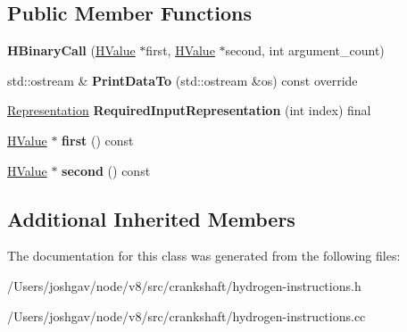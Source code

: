 \subsection*{Public Member Functions}
\begin{DoxyCompactItemize}
\item 
{\bfseries H\+Binary\+Call} (\hyperlink{classv8_1_1internal_1_1_h_value}{H\+Value} $\ast$first, \hyperlink{classv8_1_1internal_1_1_h_value}{H\+Value} $\ast$second, int argument\+\_\+count)\hypertarget{classv8_1_1internal_1_1_h_binary_call_ab826c7aadd4a8ca53a6670b9f3a9cb20}{}\label{classv8_1_1internal_1_1_h_binary_call_ab826c7aadd4a8ca53a6670b9f3a9cb20}

\item 
std\+::ostream \& {\bfseries Print\+Data\+To} (std\+::ostream \&os) const  override\hypertarget{classv8_1_1internal_1_1_h_binary_call_a41e5f4c83245c438247fb8194d9e87e8}{}\label{classv8_1_1internal_1_1_h_binary_call_a41e5f4c83245c438247fb8194d9e87e8}

\item 
\hyperlink{classv8_1_1internal_1_1_representation}{Representation} {\bfseries Required\+Input\+Representation} (int index) final\hypertarget{classv8_1_1internal_1_1_h_binary_call_ade54fc94ee05f7b16de6ad5ade9bff4e}{}\label{classv8_1_1internal_1_1_h_binary_call_ade54fc94ee05f7b16de6ad5ade9bff4e}

\item 
\hyperlink{classv8_1_1internal_1_1_h_value}{H\+Value} $\ast$ {\bfseries first} () const \hypertarget{classv8_1_1internal_1_1_h_binary_call_a612e65856e385927bb9649dfce373a85}{}\label{classv8_1_1internal_1_1_h_binary_call_a612e65856e385927bb9649dfce373a85}

\item 
\hyperlink{classv8_1_1internal_1_1_h_value}{H\+Value} $\ast$ {\bfseries second} () const \hypertarget{classv8_1_1internal_1_1_h_binary_call_a9f95766f11cd55df02257ca08663178f}{}\label{classv8_1_1internal_1_1_h_binary_call_a9f95766f11cd55df02257ca08663178f}

\end{DoxyCompactItemize}
\subsection*{Additional Inherited Members}


The documentation for this class was generated from the following files\+:\begin{DoxyCompactItemize}
\item 
/\+Users/joshgav/node/v8/src/crankshaft/hydrogen-\/instructions.\+h\item 
/\+Users/joshgav/node/v8/src/crankshaft/hydrogen-\/instructions.\+cc\end{DoxyCompactItemize}
